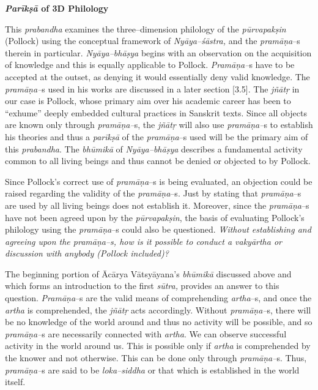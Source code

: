 \textbf{\textit{Parīkṣā} of 3D Philology}

This \textit{prabandha} examines the three–dimension philology of the \textit{pūrvapakṣin} (Pollock) using the conceptual framework of \textit{Nyāya–śāstra,} and the \textit{pramāṇa}–s therein in particular. \textit{Nyāya–bhāṣya} begins with an observation on the acquisition of knowledge and this is equally applicable to Pollock. \textit{Pramāṇa–}s have to be accepted at the outset, as denying it would essentially deny valid knowledge. The \textit{pramāṇa–}s used in his works are discussed in a later section [3.5]. The \textit{jñātṛ} in our case is Pollock, whose primary aim over his academic career has been to “exhume” deeply embedded cultural practices in Sanskrit texts. Since all objects are known only through \textit{pramāṇa–}s, the \textit{jñātṛ} will also use \textit{pramāṇa–}s to establish his theories and thus a \textit{parīkṣā} of the \textit{pramāṇa}–s used will be the primary aim of this \textit{prabandha}. The \textit{bhūmikā} of \textit{Nyāya–bhāṣya} describes a fundamental activity common to all living beings and thus cannot be denied or objected to by Pollock.

Since Pollock’s correct use of \textit{pramāṇa}–s is being evaluated, an objection could be raised regarding the validity of the \textit{pramāṇa}–s. Just by stating that \textit{pramāṇa}–s are used by all living beings does not establish it. Moreover, since the \textit{pramāṇa}–s have not been agreed upon by the \textit{pūrvapakṣin}, the basis of evaluating Pollock’s philology using the \textit{pramāṇa}–s could also be questioned. \textit{Without establishing and agreeing upon the pramāṇa–s, how is it possible to conduct a vakyārtha or discussion with anybody (Pollock included)?}

The beginning portion of Ācārya Vātsyāyana’s \textit{bhūmikā} discussed above and which forms an introduction to the first \textit{sūtra,} provides an answer to this question. \textit{Pramāṇa}–s are the valid means of comprehending \textit{artha}–s, and once the \textit{artha} is comprehended, the \textit{jñātṛ} acts accordingly. Without \textit{pramāṇa–}s, there will be no knowledge of the world around and thus no activity will be possible, and so \textit{pramāṇa–}s are necessarily connected with \textit{artha}. We can observe successful activity in the world around us. This is possible only if \textit{artha} is comprehended by the knower and not otherwise. This can be done only through \textit{pramāṇa–}s. Thus, \textit{pramāṇa–}s are said to be \textit{loka–siddha} or that which is established in the world itself.


